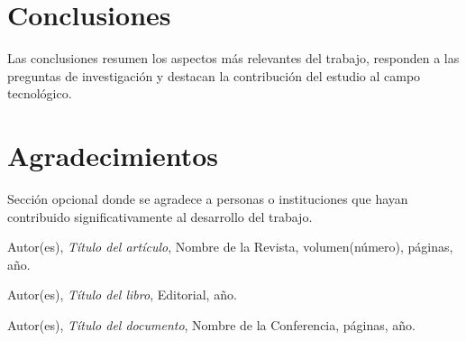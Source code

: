 \documentclass[a4paper,12pt]{article}
\begin{document}
\section{Conclusiones}
Las conclusiones resumen los aspectos más relevantes del trabajo, responden a las preguntas de investigación y destacan la contribución del estudio al campo tecnológico.

\section{Agradecimientos}
Sección opcional donde se agradece a personas o instituciones que hayan contribuido significativamente al desarrollo del trabajo.

\begin{thebibliography}{99}
Autor(es), \emph{Título del artículo}, Nombre de la Revista, volumen(número), páginas, año.

Autor(es), \emph{Título del libro}, Editorial, año.

Autor(es), \emph{Título del documento}, Nombre de la Conferencia, páginas, año.
\end{thebibliography}
\end{document}
